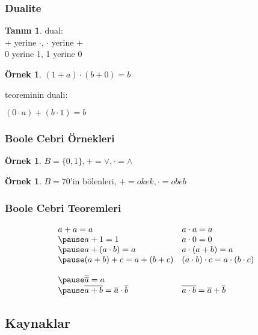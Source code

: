 \documentclass[dvipsnames]{beamer}
\theoremstyle{definition}
\newtheorem{tanim}[theorem]{Tanım}
\theoremstyle{example}
\newtheorem{ornek}[theorem]{Örnek}
\theoremstyle{plain}
\begin{document}
\begin{frame}
  \frametitle{Dualite}

  \begin{tanim}
    \alert{dual}:\\
    $+$ yerine $\cdot$, $\cdot$ yerine $+$\\
    0 yerine 1, 1 yerine 0
  \end{tanim}

  \pause
  \begin{ornek}
    $(1 + a) \cdot (b + 0) = b$

    teoreminin duali:

    $(0 \cdot a) + (b \cdot 1) = b$
  \end{ornek}
\end{frame}

\begin{frame}
  \frametitle{Boole Cebri Örnekleri}

  \begin{ornek}
    $B = \{0,1\}, + = \vee, \cdot = \wedge$
  \end{ornek}

  \pause
  \begin{ornek}
    $B = 70$'in bölenleri, $+ = okek, \cdot = obeb$
  \end{ornek}
\end{frame}

\begin{frame}
  \frametitle{Boole Cebri Teoremleri}

    \[\begin{array}{ll}
      a + a = a &
      a \cdot a = a\\ \pause
      a + 1 = 1 &
      a \cdot 0 = 0\\ \pause
      a + (a \cdot b) = a &
      a \cdot (a + b) = a\\ \pause
      (a + b) + c = a + (b + c) &
      (a \cdot b) \cdot c = a \cdot (b \cdot c)\bigskip\\ \pause
      \overline{\overline{a}} = a & \\ \pause
      \overline{a + b} = \overline{a} \cdot \overline{b} &
      \overline{a \cdot b} = \overline{a} + \overline{b}
    \end{array}\]
\end{frame}

\subsection*{Kaynaklar}
\end{document}
